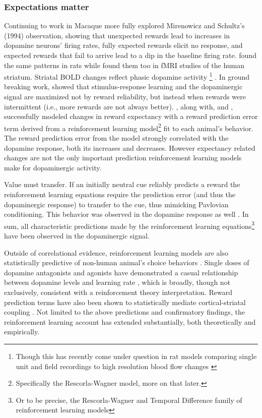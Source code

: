 \documentclass[doc,12pt]{apa}        %
\begin{document}
\subsubsection{Expectations matter} %
\label{subsub:expectations}
Continuing to work in Macaque  more fully explored Mirenowicz and Schultz's (1994) observation, showing that unexpected rewards lead to increases in dopamine neurons' firing rates, fully expected rewards elicit no response, and expected rewards that fail to arrive lead to a dip in the baseline firing rate.    found the same patterns in rats while  found them too in fMRI studies of the human striatum.  Striatal BOLD changes reflect phasic dopamine activity \cite{Schonberg:2009p6669,Surmeier:2007p4435}\footnote{
    Though this has recently come under question in rat models comparing single unit and field recordings to high resolution blood flow changes \cite{Mishra:2011p9095}}
. In ground breaking work,  showed that stimulus-response learning and the dopaminergic signal are maximized not by reward reliability, but instead when rewards were intermittent (i.e., more rewards are not always better).  , along with,  and , successfully modeled changes in reward expectancy with a reward prediction error term derived from a reinforcement learning model\footnote{
    Specifically the Rescorla-Wagner model, more on that later.
} fit to each animal's behavior. The reward prediction error from the model strongly correlated with the dopamine response, both its increases and decreases. However expectancy related changes are not the only important prediction reinforcement learning models make for dopaminergic activity.  

Value must transfer.  If an initially neutral cue reliably predicts a reward the reinforcement learning equations require the prediction error (and thus the dopaminergic response) to transfer to the cue, thus mimicking Pavlovian conditioning.  This behavior was observed in the dopamine response as well \cite{Roesch:2007p2519, McClure:2003p3346}.  In sum, all characteristic predictions made by the reinforcement learning equations\footnote{
    Or to be precise, the Rescorla-Wagner and Temporal Difference family of reinforcement learning models} 
have been observed in the dopaminergic signal.  

Outside of correlational evidence, reinforcement learning models are also statistically predictive of non-human animal's choice behaviors \cite{Hampton:2007p2983}.  Single doses of dopamine antagonists and agonists have demonstrated a casual relationship between dopamine levels and learning rate \cite{Pizzagalli:2008p6521, Diaconescu:2010p7631}, which is broadly, though not exclusively, consistent with a reinforcement theory interpretation.  Reward prediction terms have also been shown to statistically mediate cortical-striatal coupling \cite{denOuden:2010p7203}.  Not limited to the above predictions and confirmatory findings, the reinforcement learning account has extended substantially, both theoretically and empirically.
\end{document}
